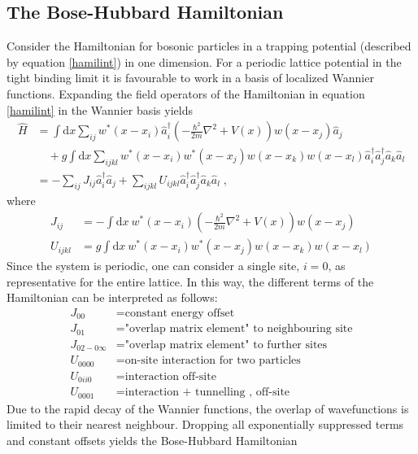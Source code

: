 \subsection{The Bose-Hubbard Hamiltonian}
Consider the Hamiltonian for bosonic particles in a trapping potential (described by equation \eqref{hamilint}) in one dimension. For a periodic lattice potential in the tight binding limit it is favourable to work in a basis of localized Wannier functions. Expanding the field operators of the Hamiltonian in equation \eqref{hamilint} in  the Wannier basis yields \cite{Jaksch}
\begin{align}
	\hat{H} &= \int \mathrm{d}x \sum_{i j} w^*(x-x_i) \hat{a}_{i}^{\dag} \left( - \frac{\hbar^2}{2 m} \nabla ^2 + V(x) \right) w(x-x_j) \hat{a}_j \nonumber \\
	& \quad + g \int \mathrm{d}x \sum_{i j k l} w^*(x-x_i) w^*(x-x_j) w(x-x_k) w(x-x_l) \hat{a}_{i}^{\dag} \hat{a}_{j}^{\dag} \hat{a}_{k} \hat{a}_{l} \\
	&= - \sum_{i j } J_{i j} \hat{a}_{i}^{\dag} \hat{a}_{j} + \sum_{i j k l} U_{i j k l} \hat{a}_{i}^{\dag} \hat{a}_{j}^{\dag} \hat{a}_{k} \hat{a}_{l} \; ,
\end{align}
where
\begin{align}
	J_{i j} &= - \int \mathrm{d}x \ w^*(x-x_i) \left( - \frac{\hbar^2}{2 m} \nabla ^2 + V(x) \right) w(x-x_j) \label{eq:BHparamJ} \\
	U_{i j k l} &= g \int \mathrm{d}x \ w^*(x-x_i) w^*(x-x_j) w(x-x_k) w(x-x_l) 
\end{align}
Since the system is periodic, one can consider a single site, $i = 0$, as representative for the entire lattice. In this way, the different terms of the Hamiltonian can be interpreted as follows:
\begin{align}
	J_{0 0} &= \text{constant energy offset} \nonumber \\
	J_{0 1} &= \text{"overlap matrix element" to neighbouring site} \nonumber \\
	J_{0 2 - 0 \infty} &= \text{"overlap matrix element" to further sites} \nonumber \\
	U_{0 0 0 0} &= \text{on-site interaction for two particles} \nonumber \\
	U_{0 i i 0} &= \text{interaction off-site} \nonumber \\
	U_{0 0 0 1} &= \text{interaction  + tunnelling , off-site} \nonumber 
\end{align}
Due to the rapid decay of the Wannier functions, the overlap of wavefunctions is limited to their nearest neighbour. Dropping all exponentially suppressed terms and constant offsets yields the Bose-Hubbard Hamiltonian
